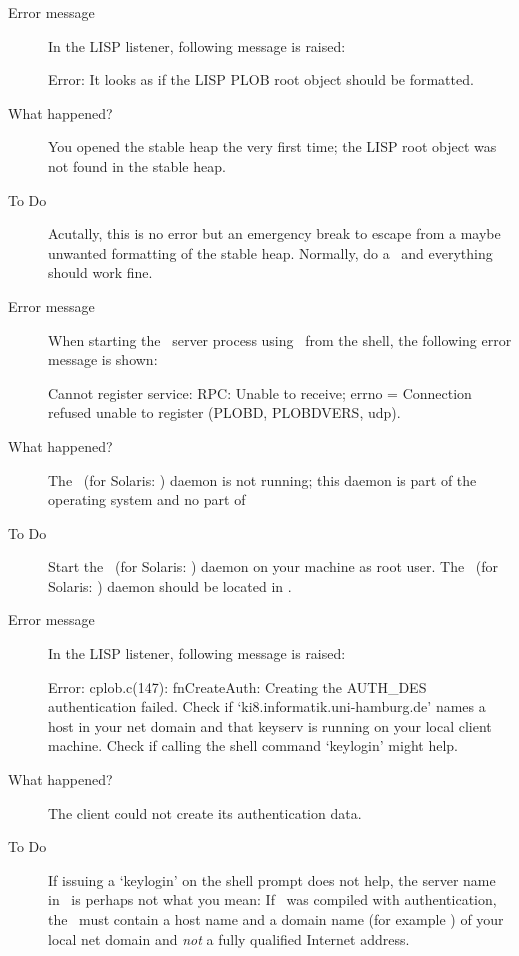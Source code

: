 \begin{description}
\item[Error message]
In the LISP listener, following message is raised:
\begin{CompactCode}
Error: It looks as if the LISP PLOB root object should be formatted.
\end{CompactCode}

\item[What happened?] You opened the stable heap the very first time;
  the LISP root object was not found in the stable heap.
\item[To Do] Acutally, this is no error but an emergency break to
  escape from a maybe unwanted formatting of the stable heap.
  Normally, do a \ and everything should work fine.
\end{description}

\begin{description}
\item[Error message] When starting the \ server process
using \ from the shell, the following error
message is shown:
\begin{CompactCode}
Cannot register service: RPC: Unable to receive; errno = Connection refused
unable to register (PLOBD, PLOBDVERS, udp).
\end{CompactCode}

\item[What happened?] The \ (for Solaris: )
daemon is not running;
this daemon is part of the operating system and no part of \plob
\item[To Do] Start the \ (for Solaris: )
daemon on your machine as root user. The
\ (for Solaris: ) daemon should be
located in .
\end{description}

\begin{description}
\item[Error message]
In the LISP listener, following message is raised:
\begin{CompactCode}
Error: cplob.c(147): fnCreateAuth:
       Creating the AUTH_DES authentication failed. Check if
       `ki8.informatik.uni-hamburg.de' names a host in your
       net domain and that keyserv is running on your local
       client machine. Check if calling the shell command
       `keylogin' might help.
\end{CompactCode}

\item[What happened?] The client could not create its authentication
  data.
\item[To Do] If issuing a `keylogin' on the shell prompt does not
  help, the server name in \ is perhaps not what
  you mean: If \plob\ was compiled with 
  authentication, the \ must contain a host name
  and a domain name (for example ) of your local
  net domain and \emph{not} a fully qualified Internet address.
\end{description}

